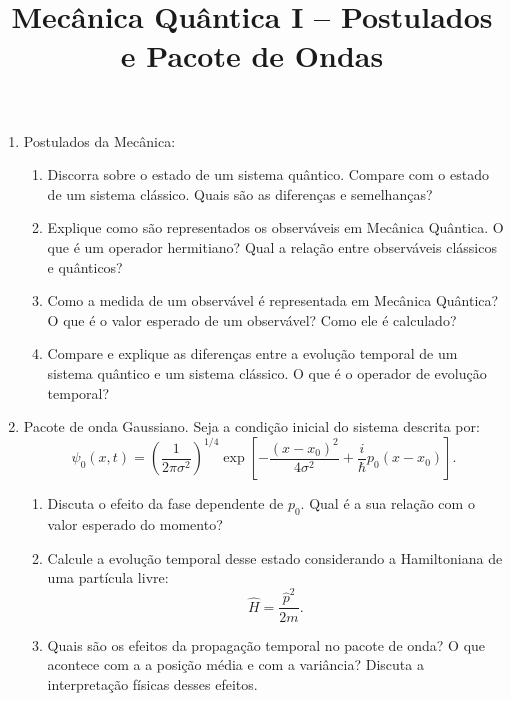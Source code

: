 \newif\ifuseseminar
\useseminartrue


\title{Mecânica Quântica I -- Postulados e Pacote de Ondas}


\begin{enumerate}
      \item Postulados da Mecânica:
            \begin{enumerate}
                  \item Discorra sobre o estado de um sistema quântico. Compare com o
                        estado de um sistema clássico. Quais são as diferenças e
                        semelhanças?
                  \item Explique como são representados os observáveis em Mecânica
                        Quântica. O que é um operador hermitiano? Qual a relação entre
                        observáveis clássicos e quânticos?
                  \item Como a medida de um observável é representada em Mecânica
                        Quântica? O que é o valor esperado de um observável? Como ele é
                        calculado?
                  \item Compare e explique as diferenças entre a evolução temporal de um
                        sistema quântico e um sistema clássico. O que é o operador de
                        evolução temporal?
            \end{enumerate}
      \item Pacote de onda Gaussiano. Seja a condição inicial do sistema descrita por:
            \begin{equation}
                  \psi_0(x, t) = \left(\frac{1}{2\pi \sigma^2}\right)^{1/4}
                  \exp\left[-\frac{(x - x_0)^2}{4\sigma^2} + \frac{i}{\hbar}p_0(x - x_0)\right].
            \end{equation}
            \begin{enumerate}
                  \item Discuta o efeito da fase dependente de $p_0$. Qual é a sua
                        relação com o valor esperado do momento?
                  \item Calcule a evolução temporal desse estado considerando a
                        Hamiltoniana de uma partícula livre:
                        \begin{equation}
                              \hat{H} = \frac{\hat{p}^2}{2m}.
                        \end{equation}
                  \item Quais são os efeitos da propagação temporal no pacote de onda? O
                        que acontece com a a posição média e com a variância? Discuta
                        a interpretação físicas desses efeitos.
            \end{enumerate}
\end{enumerate}



